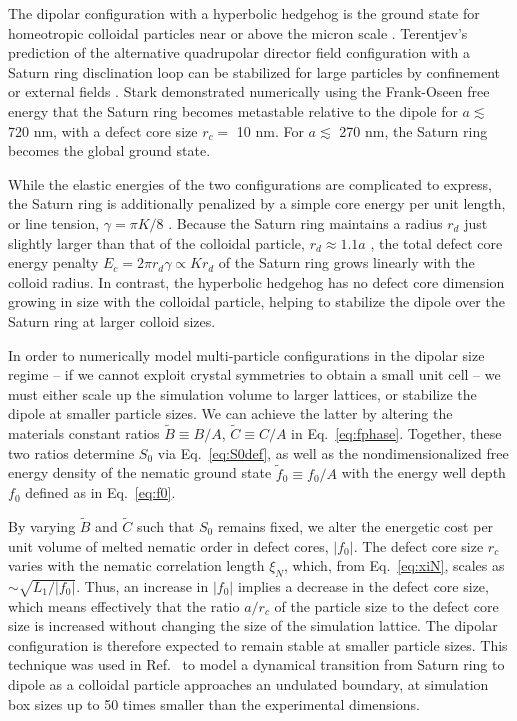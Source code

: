 \documentclass[utf8]{frontiersFPHY} %
\begin{document}
The dipolar configuration with a hyperbolic hedgehog is the ground state for homeotropic colloidal particles near or above the micron scale \citep{poulin1997novel}. Terentjev's prediction of the alternative quadrupolar director field configuration with a Saturn ring disclination loop \citep{terentjev1995disclination} can be stabilized for large particles by confinement or external fields \citep{gu2000observation,loudet2001application}. Stark  \citep{Stark2001} demonstrated numerically using the Frank-Oseen free energy that the Saturn ring becomes metastable relative to the dipole for $a \lesssim$ 720 nm, with a defect core size $r_c=$ 10 nm. For $a \lesssim$  270 nm, the Saturn ring becomes the global ground state. 


While the elastic energies of the two configurations are complicated to express, the Saturn ring is additionally penalized by a simple core energy per unit length, or line tension, $\gamma = \pi K/8$  \citep{Stark2001,deGennes_book}.  Because the Saturn ring maintains a radius $r_d$ just slightly larger than that of the colloidal particle, $r_d\approx 1.1 a$ \citep{Stark2001},  the total defect core energy penalty $E_c=2\pi r_d \gamma\propto K r_d$  of the Saturn ring grows linearly with the colloid radius. In contrast, the hyperbolic hedgehog has no  defect core dimension growing in size with the colloidal particle, helping to stabilize the dipole over the Saturn ring at larger colloid sizes. 

In order to numerically model multi-particle configurations in the dipolar size regime -- if we cannot exploit crystal symmetries to obtain a small unit cell \citep{Skarabot2008,nych2013assembly} -- we must either scale up the simulation volume to larger lattices, or stabilize the dipole at smaller particle sizes. We can achieve the latter by altering the materials constant ratios $\tilde B \equiv B/A$, $\tilde C \equiv C/A$ in Eq.~\ref{eq:fphase}. Together, these two ratios determine $S_0$ via Eq.~\ref{eq:S0def}, as well as the nondimensionalized free energy density of the nematic ground state $\tilde f_0 \equiv f_0/A$ with the energy well depth $f_0$ defined as in Eq.~\ref{eq:f0}.

By varying $\tilde B$ and $\tilde C$ such that $S_0$ remains fixed, we alter  the energetic cost per unit volume of melted nematic order in defect cores, $|f_0|$. The defect core size $r_c$ varies with the nematic correlation length $\xi_N$, which, from Eq.~\ref{eq:xiN}, scales as $\sim \sqrt{L_1/|f_0|}$. Thus, an increase in $|f_0|$ implies a decrease in the defect core size, which means effectively that the ratio $a/r_c$ of the particle size to the defect core size is increased without changing the size of the simulation lattice. The dipolar configuration is therefore expected to remain stable at smaller particle sizes. This technique was used in Ref.~\cite{luo2018tunable} to model a dynamical transition from Saturn ring to dipole as a colloidal particle approaches an undulated boundary, at simulation box sizes up to 50 times smaller than the experimental dimensions. 
\end{document}
